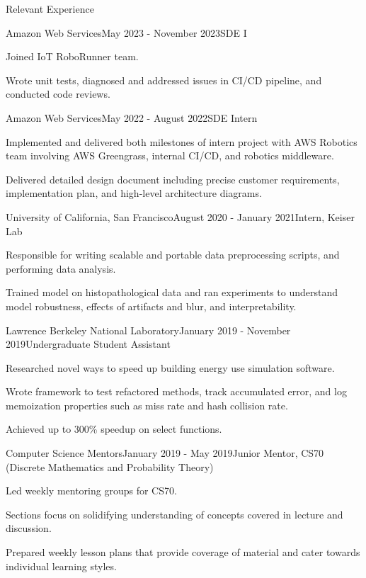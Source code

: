 \documentclass{resume}
\begin{document}
\begin{rSection}{Relevant Experience}

\begin{rSubsection}{Amazon Web Services}{May 2023 - November 2023}{SDE I}{}
\item Joined IoT RoboRunner team.
\item Wrote unit tests, diagnosed and addressed issues in CI/CD pipeline, and conducted code reviews.
\end{rSubsection}

\begin{rSubsection}{Amazon Web Services}{May 2022 - August 2022}{SDE Intern}{}
\item Implemented and delivered both milestones of intern project with AWS Robotics team involving AWS Greengrass, internal CI/CD, and robotics middleware.
\item Delivered detailed design document including precise customer requirements, implementation plan, and high-level architecture diagrams.
\end{rSubsection}

\begin{rSubsection}{University of California, San Francisco}{August 2020 - January 2021}{Intern, Keiser Lab}{}
\item Responsible for writing scalable and portable data preprocessing scripts, and performing data analysis.
\item Trained model on histopathological data and ran experiments to understand model robustness, effects of artifacts and blur, and interpretability.
\end{rSubsection}

\begin{rSubsection}{Lawrence Berkeley National Laboratory}{January 2019 - November 2019}{Undergraduate Student Assistant}{}
\item Researched novel ways to speed up building energy use simulation software. 
\item Wrote framework 
to test refactored methods, track accumulated
error, and log memoization properties such as miss rate and hash collision rate. 
\item Achieved up to 300\% speedup on select functions. 
\end{rSubsection}



\begin{rSubsection}{Computer Science Mentors}{January 2019 - May 2019}{Junior Mentor, CS70 (Discrete Mathematics and Probability Theory)}{}
\item Led weekly mentoring groups for CS70. 
\item Sections focus on solidifying understanding of concepts covered in lecture and discussion. 
\item Prepared weekly lesson plans that provide coverage of material and cater towards individual learning
styles.
\end{rSubsection}


\end{rSection}
\end{document}
